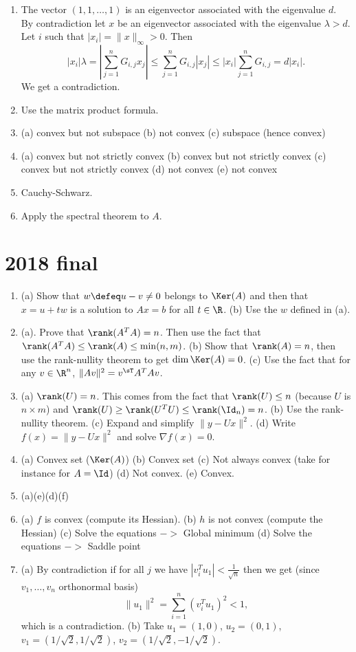 \documentclass[11pt,nocut]{article}
\begin{document}
\begin{enumerate}
	\item The vector $(1,1, \dots,1)$ is an eigenvector associated with the eigenvalue $d$. By contradiction let $x$ be an eigenvector associated with the eigenvalue $\lambda >d$. Let $i$ such that $|x_i| = \|x\|_{\infty} >0$. Then
		$$
		|x_i| \lambda 
		= |\sum_{j=1}^n G_{i,j} x_j|
		\leq \sum_{j=1}^n G_{i,j} |x_j|
		\leq |x_i| \sum_{j=1}^n G_{i,j} = d |x_i|.
		$$
		We get a contradiction.
	\item Use the matrix product formula.
	\item (a) convex but not subspace (b) not convex (c) subspace (hence convex)
	\item (a) convex but not strictly convex (b) convex but not strictly convex (c) convex but not strictly convex (d) not convex (e) not convex
	\item Cauchy-Schwarz.
	\item Apply the spectral theorem to $A$.
\end{enumerate}

\section{2018 final}

\begin{enumerate}
	\item (a) Show that $w \defeq u-v \neq 0$ belongs to $\Ker(A)$ and then that $x=u+tw$ is a solution to $Ax=b$ for all $t \in \R$. (b) Use the $w$ defined in (a).
	\item (a). Prove that $\rank(A^T A) = n$. Then use the fact that $\rank(A^T A) \leq \rank(A) \leq \min(n,m)$. (b) Show that $\rank(A) = n$, then use the rank-nullity theorem to get $\dim \Ker(A) = 0$. (c) Use the fact that for any $v \in \R^n$, $\|Av\|^2 = v^{\sT} A^T A v$.
	\item (a) $\rank(U) = n$. This comes from the fact that $\rank(U) \leq n$ (because $U$ is $n \times m$) and $\rank(U) \geq \rank(U^T U) \leq \rank(\Id_n) = n$. (b) Use the rank-nullity theorem.
		(c) Expand and simplify $\|y-Ux\|^2$.
		(d) Write $f(x) = \|y-Ux\|^2$ and solve $\nabla f(x) = 0$.
	\item (a) Convex set ($\Ker(A)$)
		(b) Convex set
		(c) Not always convex (take for instance for $A=\Id$)
		(d) Not convex.
		(e) Convex.
	\item (a)(e)(d)(f)
	\item (a) $f$ is convex (compute its Hessian).
		(b) $h$ is not convex (compute the Hessian)
		(c) Solve the equations $->$ Global minimum
		(d) Solve the equations $->$ Saddle point
	\item (a) By contradiction if for all $j$ we have $|v_i^T u_1| < \frac{1}{\sqrt{n}}$ then we get (since $v_1, \dots, v_n$ orthonormal basis)
		$$
		\|u_1\|^2 = \sum_{i=1}^n (v_i^T u_1)^2 < 1,
		$$
		which is a contradiction.
		(b) Take $u_1=(1,0)$, $u_2=(0,1)$, $v_1 = (1/\sqrt{2}, 1/\sqrt{2})$, $v_2 = (1/\sqrt{2},-1/\sqrt{2})$.
\end{enumerate}

\vspace{1cm}
\centerline{}

%
%
\end{document}
